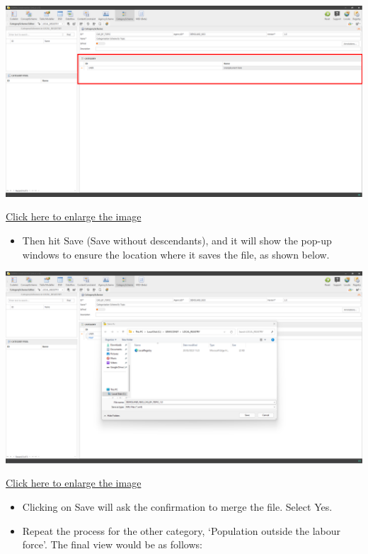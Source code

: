 \documentclass[
]{book}
\providecommand{\tightlist}{%
  \setlength{\itemsep}{0pt}\setlength{\parskip}{0pt}}
\begin{document}
\begin{center}\includegraphics[width=1\linewidth]{./images/image180} \end{center}

\href{images/image180.png}{Click here to enlarge the image}

\begin{itemize}
\tightlist
\item
  Then hit Save (Save without descendants), and it will show the pop-up windows to ensure the location where it saves the file, as shown below.
\end{itemize}

\begin{center}\includegraphics[width=1\linewidth]{./images/image182} \end{center}

\href{images/image182.png}{Click here to enlarge the image}

\begin{itemize}
\tightlist
\item
  Clicking on Save will ask the confirmation to merge the file. Select Yes.
\item
  Repeat the process for the other category, `Population outside the labour force'. The final view would be as follows:
\end{itemize}
\end{document}
